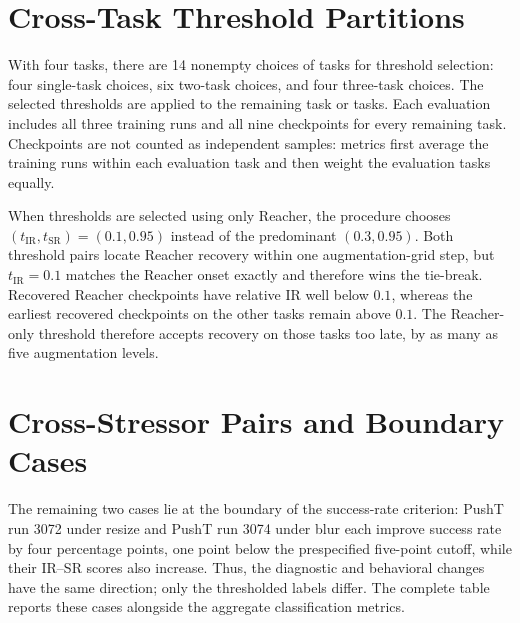 \documentclass[10pt]{article}
\begin{document}



\FloatBarrier
\section{Cross-Task Threshold Partitions}\label{sec:appendix-cross-task}

With four tasks, there are 14 nonempty choices of tasks for threshold
selection: four single-task choices, six two-task choices, and four three-task
choices. The selected thresholds are applied to the remaining task or tasks.
Each evaluation includes all three training runs and all nine checkpoints for
every remaining task. Checkpoints are not counted as independent samples:
metrics first average the training runs within each evaluation task and then
weight the evaluation tasks equally.

When thresholds are selected using only Reacher, the procedure chooses
$(t_{\mathrm{IR}},t_{\mathrm{SR}})=(0.1,0.95)$ instead of the predominant
$(0.3,0.95)$. Both threshold pairs locate Reacher recovery within one
augmentation-grid step, but $t_{\mathrm{IR}}=0.1$ matches the Reacher onset
exactly and therefore wins the tie-break. Recovered Reacher checkpoints have
relative IR well below $0.1$, whereas the earliest recovered checkpoints on
the other tasks remain above $0.1$. The Reacher-only threshold therefore
accepts recovery on those tasks too late, by as many as five augmentation
levels.



\FloatBarrier
\section{Cross-Stressor Pairs and Boundary Cases}
\label{sec:appendix-cross-stressor}



The remaining two cases lie at the boundary of the success-rate criterion:
PushT run 3072 under resize and PushT run 3074 under blur each improve success
rate by four percentage points, one point below the prespecified five-point
cutoff, while their IR--SR scores also increase. Thus, the diagnostic and
behavioral changes have the same direction; only the thresholded labels
differ. The complete table reports these cases alongside the aggregate
classification metrics.


\end{document}
